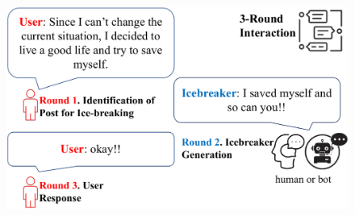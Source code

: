 \begin{figure}[th]
	\centering
	\includegraphics[width=1\columnwidth]{images/pipeline2.pdf}
	\caption{}
\label{fig:pipeline2}
\end{figure}

